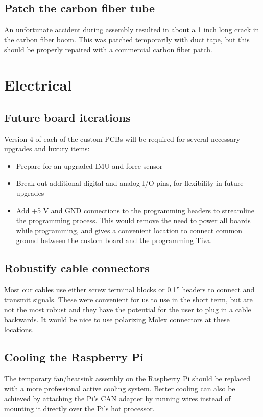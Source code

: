 \documentclass{report}
\begin{document}
\subsection[Patch the carbon fiber tube]{Patch the carbon fiber tube}
An unfortunate accident during assembly resulted in about a 1 inch long crack in the carbon fiber boom. This was patched temporarily with duct tape, but this should be properly repaired with a commercial carbon fiber patch.

\section[Electrical]{Electrical}
\subsection[Future board iterations]{Future board iterations}
Version 4 of each of the custom PCBs will be required for several necessary upgrades and luxury items:
\begin{itemize}
\item Prepare for an upgraded IMU and force sensor
\item Break out additional digital and analog I/O pins, for flexibility in future upgrades
\item Add +5 V and GND connections to the programming headers to streamline the programming process. This would remove the need to power all boards while programming, and gives a convenient location to connect common ground between the custom board and the programming Tiva.
\end{itemize}

\subsection[Robustify cable connectors]{Robustify cable connectors}
Most our cables use either screw terminal blocks or 0.1'' headers to connect and transmit signals. These were convenient for us to use in the short term, but are not the most robust and they have the potential for the user to plug in a cable backwards. It would be nice to use polarizing Molex connectors at these locations.

\subsection[Cooling the Raspberry Pi]{Cooling the Raspberry Pi}
The temporary fan/heatsink assembly on the Raspberry Pi should be replaced with a more professional active cooling system. Better cooling can also be achieved by attaching the Pi's CAN adapter by running wires instead of mounting it directly over the Pi's hot processor.
\end{document}
